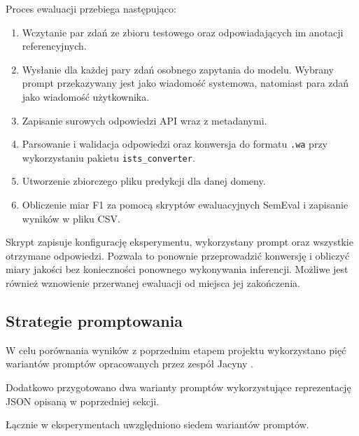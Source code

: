 \documentclass[a4paper,10pt]{article}
\begin{document}
Proces ewaluacji przebiega następująco:

\begin{enumerate}
    \item Wczytanie par zdań ze zbioru testowego
    oraz odpowiadających im anotacji referencyjnych.

    \item Wysłanie dla każdej pary zdań osobnego
    zapytania do modelu. Wybrany prompt przekazywany
    jest jako wiadomość systemowa, natomiast para zdań
    jako wiadomość użytkownika.

    \item Zapisanie surowych odpowiedzi API wraz
    z metadanymi.

    \item Parsowanie i walidacja odpowiedzi oraz
    konwersja do formatu \texttt{.wa} przy wykorzystaniu
    pakietu \texttt{ists\_converter}.

    \item Utworzenie zbiorczego pliku predykcji
    dla danej domeny.

    \item Obliczenie miar F1 za pomocą skryptów
    ewaluacyjnych SemEval i zapisanie wyników
    w pliku CSV.
\end{enumerate}

Skrypt zapisuje konfigurację eksperymentu, wykorzystany
prompt oraz wszystkie otrzymane odpowiedzi. Pozwala
to ponownie przeprowadzić konwersję i obliczyć miary
jakości bez konieczności ponownego wykonywania inferencji.
Możliwe jest również wznowienie przerwanej ewaluacji
od miejsca jej zakończenia.


\subsection{Strategie promptowania}

W celu porównania wyników z poprzednim etapem projektu
wykorzystano pięć wariantów promptów opracowanych
przez zespół Jacyny \cite{jacyna}.

Dodatkowo przygotowano dwa warianty promptów
wykorzystujące reprezentację JSON opisaną w poprzedniej
sekcji.

Łącznie w eksperymentach uwzględniono siedem wariantów
promptów.
\end{document}
